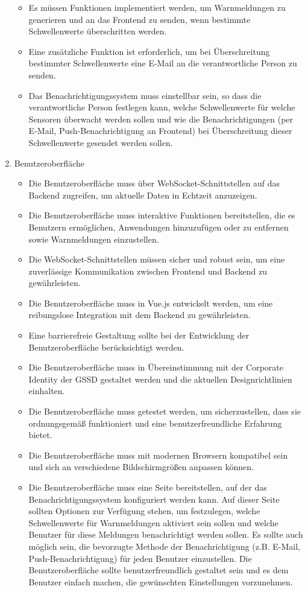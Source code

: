 \begin{enumerate}
\begin{itemize}
				\item Es müssen Funktionen implementiert werden, um Warnmeldungen zu generieren und an das Frontend zu senden, wenn bestimmte Schwellenwerte überschritten werden.
				\item Eine zusätzliche Funktion ist erforderlich, um bei Überschreitung bestimmter Schwellenwerte eine E-Mail an die verantwortliche Person zu senden.
				\item Das Benachrichtigungssystem muss einstellbar sein, so dass die verantwortliche Person festlegen kann, welche Schwellenwerte für welche Sensoren überwacht werden sollen und wie die Benachrichtigungen (per E-Mail, Push-Benachrichtigung an Frontend) bei Überschreitung dieser Schwellenwerte gesendet werden sollen.
			\end{itemize}

		\item Benutzeroberfläche
			\begin{itemize}
				\item Die Benutzeroberfläche muss über WebSocket-Schnittstellen auf das Backend zugreifen, um aktuelle Daten in Echtzeit anzuzeigen.
				\item Die Benutzeroberfläche muss interaktive Funktionen bereitstellen, die es Benutzern ermöglichen, Anwendungen hinzuzufügen oder zu entfernen sowie Warnmeldungen einzustellen.
				\item Die WebSocket-Schnittstellen müssen sicher und robust sein, um eine zuverlässige Kommunikation zwischen Frontend und Backend zu gewährleisten.
				\item Die Benutzeroberfläche muss in Vue.js entwickelt werden, um eine reibungslose Integration mit dem Backend zu gewährleisten.
				\item Eine barrierefreie Gestaltung sollte bei der Entwicklung der Benutzeroberfläche berücksichtigt werden.
				\item Die Benutzeroberfläche muss in Übereinstimmung mit der Corporate Identity der \acs{GSSD} gestaltet werden und die aktuellen Designrichtlinien einhalten.
				\item Die Benutzeroberfläche muss getestet werden, um sicherzustellen, dass sie ordnungsgemäß funktioniert und eine benutzerfreundliche Erfahrung bietet.
				\item Die Benutzeroberfläche muss mit modernen Browsern kompatibel sein und sich an verschiedene Bildschirmgrößen anpassen können.
				\item Die Benutzeroberfläche muss eine Seite bereitstellen, auf der das Benachrichtigungssystem konfiguriert werden kann. Auf dieser Seite sollten Optionen zur Verfügung stehen, um festzulegen, welche Schwellenwerte für Warnmeldungen aktiviert sein sollen und welche Benutzer für diese Meldungen benachrichtigt werden sollen. Es sollte auch möglich sein, die bevorzugte Methode der Benachrichtigung (z.B. E-Mail, Push-Benachrichtigung) für jeden Benutzer einzustellen. Die Benutzeroberfläche sollte benutzerfreundlich gestaltet sein und es dem Benutzer einfach machen, die gewünschten Einstellungen vorzunehmen.

\end{itemize}
\end{enumerate}
